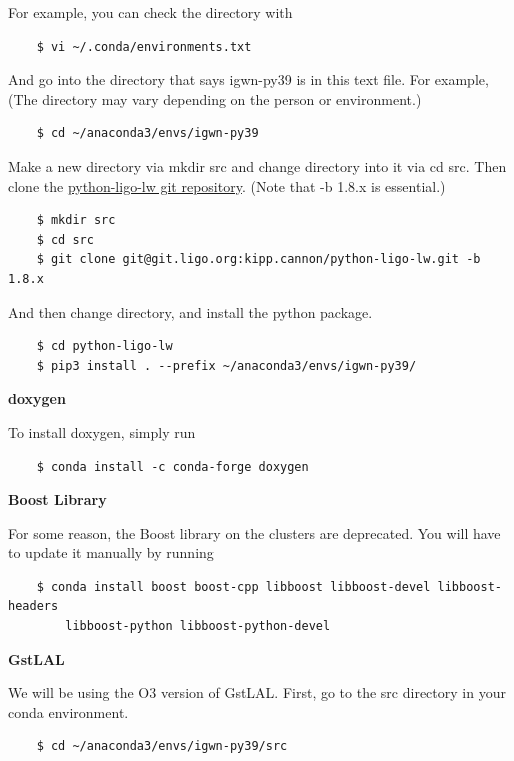 For example, you can check the directory with

\begin{verbatim}
    $ vi ~/.conda/environments.txt
\end{verbatim}

And go into the directory that says igwn-py39 is in this text file. For example, (The directory may vary depending on the person or environment.)

\begin{verbatim}
    $ cd ~/anaconda3/envs/igwn-py39
\end{verbatim}

Make a new directory via mkdir src and change directory into it via cd src. Then clone the \href{https://git.ligo.org/kipp/python-ligo-lw/-/tree/1.8.x?ref_type=heads}{python-ligo-lw git repository}. (Note that -b 1.8.x is essential.)

\begin{verbatim}
    $ mkdir src
    $ cd src
    $ git clone git@git.ligo.org:kipp.cannon/python-ligo-lw.git -b 1.8.x
\end{verbatim}

And then change directory, and install the python package.

\begin{verbatim}
    $ cd python-ligo-lw
    $ pip3 install . --prefix ~/anaconda3/envs/igwn-py39/
\end{verbatim}

\textbf{doxygen}

To install doxygen, simply run

\begin{verbatim}
    $ conda install -c conda-forge doxygen
\end{verbatim}

\textbf{Boost Library}

For some reason, the Boost library on the clusters are deprecated. You will have to update it manually by running

\begin{verbatim}
    $ conda install boost boost-cpp libboost libboost-devel libboost-headers
        libboost-python libboost-python-devel
\end{verbatim}

\textbf{GstLAL}

We will be using the O3 version of GstLAL. First, go to the src directory in your conda environment.

\begin{verbatim}
    $ cd ~/anaconda3/envs/igwn-py39/src
\end{verbatim}

